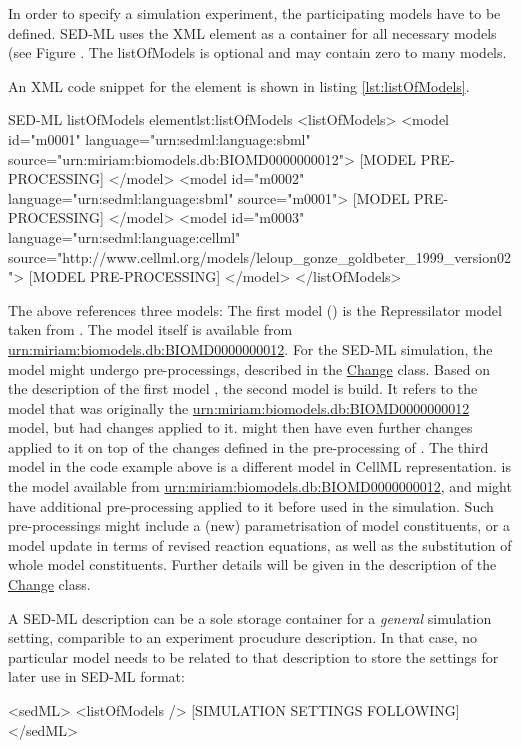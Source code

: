 \label{sec:listOfModels}
In order to specify a simulation experiment, the participating models have to be defined. SED-ML uses the XML  element as a container for all necessary models (see Figure . The listOfModels is optional and may contain zero to many models. 

%

An XML code snippet for the  element is shown in listing \ref{lst:listOfModels}.
%
\begin{myXmlLst}{SED-ML listOfModels element}{lst:listOfModels}
<listOfModels>
 <model id="m0001" language="urn:sedml:language:sbml" source="urn:miriam:biomodels.db:BIOMD0000000012">
 [MODEL PRE-PROCESSING]
 </model>
 <model id="m0002" language="urn:sedml:language:sbml" source="m0001">
 [MODEL PRE-PROCESSING]
 </model>
 <model id="m0003" language="urn:sedml:language:cellml" source="http://www.cellml.org/models/leloup_gonze_goldbeter_1999_version02">
 [MODEL PRE-PROCESSING]
 </model>
</listOfModels>
\end{myXmlLst}
%
The above  references three models: The first model () is the Repressilator model taken from \biom. The model itself is available from \url{urn:miriam:biomodels.db:BIOMD0000000012}. For the SED-ML simulation, the model might undergo pre-processings, described in the \hyperref[class:change]{Change} class.
Based on the description of the first model , the second model is build. It refers to the model that was originally the \url{urn:miriam:biomodels.db:BIOMD0000000012} model, but had changes applied to it.  might then have even further changes applied to it on top of the changes defined in the pre-processing of .
The third model in the code example above is a different model in CellML representation.  is the model available from \url{urn:miriam:biomodels.db:BIOMD0000000012}, and might have additional pre-processing applied to it before used in the simulation.
Such pre-processings might include a (new) parametrisation of model constituents, or a model update in terms of revised reaction equations, as well as the substitution of whole model constituents. Further details will be given in the description of the \hyperref[class:change]{Change} class.

A SED-ML description can be a sole storage container for a \emph{general} simulation setting, comparible to an experiment procudure description. In that case, no particular model needs to be related to that description to store the settings for later use in SED-ML format:
%
\begin{myXmlLst}{}{}
<sedML>
 <listOfModels />
 [SIMULATION SETTINGS FOLLOWING]
</sedML>
\end{myXmlLst}
%




